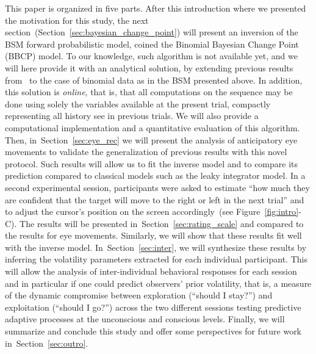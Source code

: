 \documentclass[12pt,english]{article}%
\newcommand{\citet}[1]{\textcite{#1}}
\newcommand{\seeFig}[1]{Figure~\ref{fig:#1}}
\newcommand{\seeSec}[1]{Section~\ref{sec:#1}}
\begin{document}
This paper is organized in five parts.
After this introduction where we presented the motivation for this study,
the next section~(\seeSec{bayesian_change_point}) will present
an inversion of the BSM forward probabilistic model,
coined the Binomial Bayesian Change Point (BBCP) model.
To our knowledge, such algorithm is not available yet, and
we will here provide it with an analytical solution,
by extending previous results from~\citet{AdamsMackay2007}
to the case of binomial data as in the BSM presented above.
In addition, this solution is \emph{online},
that is, that all computations on the sequence may be done
using solely the variables available at the present trial,
compactly representing all history see in previous trials.
We will also provide a computational implementation
and a quantitative evaluation of this algorithm.
Then, in~\seeSec{eye_rec} we will present  the analysis of anticipatory eye movements
to validate the generalization of previous results %
with this novel protocol. %
Such results will allow us to fit the inverse model and to compare
its prediction compared to classical models such as the leaky integrator model.
In a second experimental session, participants were asked to estimate
``how much they are confident that
the target will move to the right or left in the next trial'' and
to adjust the cursor's position on the screen accordingly~(see \seeFig{intro}-C).
The results will be presented in~\seeSec{rating_scale}
and compared to the results for eye movements.
Similarly, we will show that these results fit well
with the inverse model.
In~\seeSec{inter}, we will synthesize these results
by inferring the volatility parameters extracted
for each individual participant. %
This will allow the analysis of inter-individual behavioral responses for each session
and in particular if one could predict observers' prior volatility,
that is, a measure of the dynamic compromise between exploration (``should I stay?'')
and exploitation (``should I go?'')
across the two different sessions testing predictive adaptive processes
at the unconscious and conscious levels.
Finally, we will summarize and conclude this study and
offer some perspectives for future work in~\seeSec{outro}.
\end{document}

